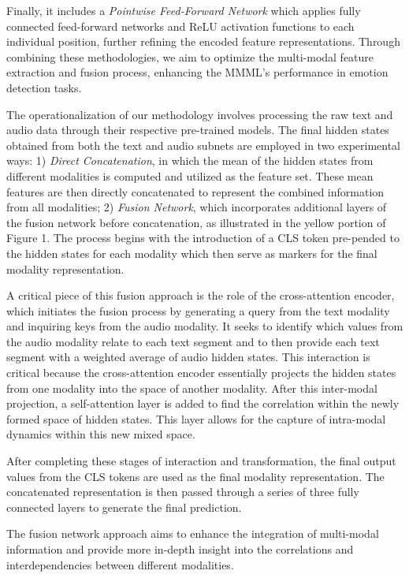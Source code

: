 \documentclass[11pt]{article}
\begin{document}
Finally, it includes a {\it Pointwise Feed-Forward Network} which applies fully connected feed-forward networks and ReLU activation functions to each individual position, further refining the encoded feature representations. Through combining these methodologies, we aim to optimize the multi-modal feature extraction and fusion process, enhancing the MMML's performance in emotion detection tasks.

The operationalization of our methodology involves processing the raw text and audio data through their respective pre-trained models. The final hidden states obtained from both the text and audio subnets are employed in two experimental ways:  1) {\it Direct Concatenation}, in which the mean of the hidden states from different modalities is computed and utilized as the feature set. These mean features are then directly concatenated to represent the combined information from all modalities; 2) {\it Fusion Network}, which incorporates additional layers of the fusion network before concatenation, as illustrated in the yellow portion of Figure 1. The process begins with the introduction of a CLS token pre-pended to the hidden states for each modality which then serve as markers for the final modality representation.

A critical piece of this fusion approach is the role of the cross-attention encoder, which initiates the fusion process by generating a query from the text modality and inquiring keys from the audio modality. It seeks to identify which values from the audio modality relate to each text segment and to then provide each text segment with a weighted average of audio hidden states.  This interaction is critical because the cross-attention encoder essentially projects the hidden states from one modality into the space of another modality. After this inter-modal projection, a self-attention layer is added to find the correlation within the newly formed space of hidden states. This layer allows for the capture of intra-modal dynamics within this new mixed space.

After completing these stages of interaction and transformation, the final output values from the CLS tokens are used as the final modality representation. The concatenated representation is then passed through a series of three fully connected layers to generate the final prediction.

The fusion network approach aims to enhance the integration of multi-modal information and provide more in-depth insight into the correlations and interdependencies between different modalities.
\end{document}
